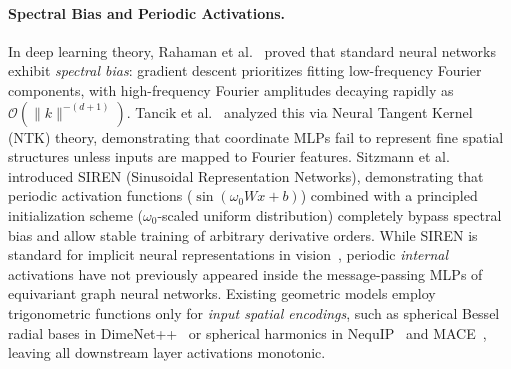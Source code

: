 \documentclass[10pt,twocolumn,letterpaper]{article}
\begin{document}
\paragraph{Spectral Bias and Periodic Activations.}
In deep learning theory, Rahaman et al.~\cite{rahaman2019spectral} proved that standard neural networks exhibit \textit{spectral bias}: gradient descent prioritizes fitting low-frequency Fourier components, with high-frequency Fourier amplitudes decaying rapidly as $\mathcal{O}(\|k\|^{-(d+1)})$.
Tancik et al.~\cite{tancik2020fourier} analyzed this via Neural Tangent Kernel (NTK) theory, demonstrating that coordinate MLPs fail to represent fine spatial structures unless inputs are mapped to Fourier features.
Sitzmann et al.~\cite{sitzmann2020siren} introduced SIREN (Sinusoidal Representation Networks), demonstrating that periodic activation functions ($\sin(\omega_0 W x + b)$) combined with a principled initialization scheme ($\omega_0$-scaled uniform distribution) completely bypass spectral bias and allow stable training of arbitrary derivative orders.
While SIREN is standard for implicit neural representations in vision~\cite{sitzmann2020siren}, periodic \textit{internal} activations have not previously appeared inside the message-passing MLPs of equivariant graph neural networks. Existing geometric models employ trigonometric functions only for \textit{input spatial encodings}, such as spherical Bessel radial bases in DimeNet++~\cite{klicperaFastUncertaintyAwareDirectional2020} or spherical harmonics in NequIP~\cite{batznerE3equivariantGraphNeural2021} and MACE~\cite{batatiaMACEHigherOrder2022}, leaving all downstream layer activations monotonic.
\end{document}
